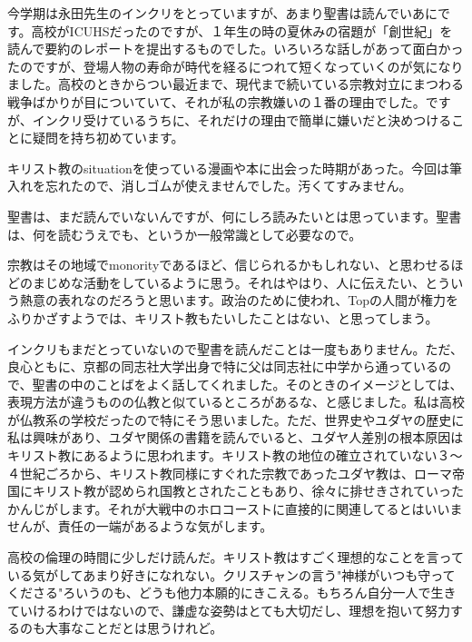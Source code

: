\item
今学期は永田先生のインクリをとっていますが、あまり聖書は読んでいあにです。高校がICUHSだったのですが、１年生の時の夏休みの宿題が「創世紀」を読んで要約のレポートを提出するものでした。いろいろな話しがあって面白かったのですが、登場人物の寿命が時代を経るにつれて短くなっていくのが気になりました。高校のときからつい最近まで、現代まで続いている宗教対立にまつわる戦争ばかりが目についていて、それが私の宗教嫌いの１番の理由でした。ですが、インクリ受けているうちに、それだけの理由で簡単に嫌いだと決めつけることに疑問を持ち初めています。

\item
キリスト教のsituationを使っている漫画や本に出会った時期があった。今回は筆入れを忘れたので、消しゴムが使えませんでした。汚くてすみません。

\item
聖書は、まだ読んでいないんですが、何にしろ読みたいとは思っています。聖書は、何を読むうえでも、というか一般常識として必要なので。

\item
宗教はその地域でmonorityであるほど、信じられるかもしれない、と思わせるほどのまじめな活動をしているように思う。それはやはり、人に伝えたい、とういう熱意の表れなのだろうと思います。政治のために使われ、Topの人間が権力をふりかざすようでは、キリスト教もたいしたことはない、と思ってしまう。

\item
インクリもまだとっていないので聖書を読んだことは一度もありません。ただ、良心ともに、京都の同志社大学出身で特に父は同志社に中学から通っているので、聖書の中のことばをよく話してくれました。そのときのイメージとしては、表現方法が違うものの仏教と似ているところがあるな、と感じました。私は高校が仏教系の学校だったので特にそう思いました。ただ、世界史やユダヤの歴史に私は興味があり、ユダヤ関係の書籍を読んでいると、ユダヤ人差別の根本原因はキリスト教にあるように思われます。キリスト教の地位の確立されていない３〜４世紀ごろから、キリスト教同様にすぐれた宗教であったユダヤ教は、ローマ帝国にキリスト教が認められ国教とされたこともあり、徐々に排せきされていったかんじがします。それが大戦中のホロコーストに直接的に関連してるとはいいませんが、責任の一端があるような気がします。

\item
高校の倫理の時間に少しだけ読んだ。キリスト教はすごく理想的なことを言っている気がしてあまり好きになれない。クリスチャンの言う"神様がいつも守ってくださる"ろいうのも、どうも他力本願的にきこえる。もちろん自分一人で生きていけるわけではないので、謙虚な姿勢はとても大切だし、理想を抱いて努力するのも大事なことだとは思うけれど。

